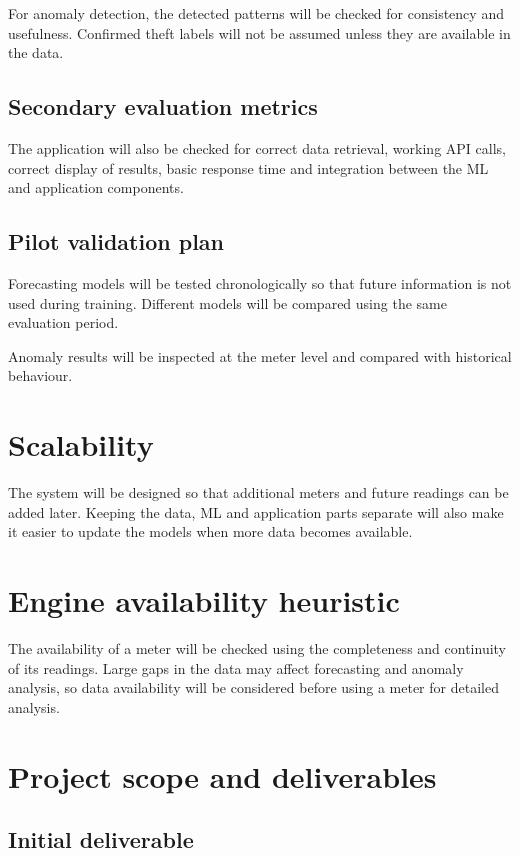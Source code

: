 \documentclass[11pt,a4paper]{article}
\begin{document}
For anomaly detection, the detected patterns will be checked for
consistency and usefulness. Confirmed theft labels will not be
assumed unless they are available in the data.

\subsection{Secondary evaluation metrics}

The application will also be checked for correct data retrieval,
working API calls, correct display of results, basic response time
and integration between the ML and application components.

\subsection{Pilot validation plan}

Forecasting models will be tested chronologically so that future
information is not used during training. Different models will be
compared using the same evaluation period.

Anomaly results will be inspected at the meter level and compared
with historical behaviour.

\section{Scalability}

The system will be designed so that additional meters and future
readings can be added later. Keeping the data, ML and application
parts separate will also make it easier to update the models when
more data becomes available.

\section{Engine availability heuristic}

The availability of a meter will be checked using the completeness
and continuity of its readings. Large gaps in the data may affect
forecasting and anomaly analysis, so data availability will be
considered before using a meter for detailed analysis.

\section{Project scope and deliverables}

\subsection{Initial deliverable}
\end{document}
